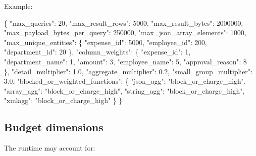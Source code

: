 \documentclass[
]{article}
\newenvironment{Shaded}{}{}
\newcommand{\DataTypeTok}[1]{\textcolor[rgb]{0.56,0.13,0.00}{#1}}
\newcommand{\DecValTok}[1]{\textcolor[rgb]{0.25,0.63,0.44}{#1}}
\newcommand{\FloatTok}[1]{\textcolor[rgb]{0.25,0.63,0.44}{#1}}
\newcommand{\FunctionTok}[1]{\textcolor[rgb]{0.02,0.16,0.49}{#1}}
\newcommand{\StringTok}[1]{\textcolor[rgb]{0.25,0.44,0.63}{#1}}
\begin{document}
Example:

\begin{Shaded}
\begin{Highlighting}[]
\FunctionTok{\{}
  \DataTypeTok{"max\_queries"}\FunctionTok{:} \DecValTok{20}\FunctionTok{,}
  \DataTypeTok{"max\_result\_rows"}\FunctionTok{:} \DecValTok{5000}\FunctionTok{,}
  \DataTypeTok{"max\_result\_bytes"}\FunctionTok{:} \DecValTok{2000000}\FunctionTok{,}
  \DataTypeTok{"max\_payload\_bytes\_per\_query"}\FunctionTok{:} \DecValTok{250000}\FunctionTok{,}
  \DataTypeTok{"max\_json\_array\_elements"}\FunctionTok{:} \DecValTok{1000}\FunctionTok{,}
  \DataTypeTok{"max\_unique\_entities"}\FunctionTok{:} \FunctionTok{\{}
    \DataTypeTok{"expense\_id"}\FunctionTok{:} \DecValTok{5000}\FunctionTok{,}
    \DataTypeTok{"employee\_id"}\FunctionTok{:} \DecValTok{200}\FunctionTok{,}
    \DataTypeTok{"department\_id"}\FunctionTok{:} \DecValTok{20}
  \FunctionTok{\},}
  \DataTypeTok{"column\_weights"}\FunctionTok{:} \FunctionTok{\{}
    \DataTypeTok{"expense\_id"}\FunctionTok{:} \DecValTok{1}\FunctionTok{,}
    \DataTypeTok{"department\_name"}\FunctionTok{:} \DecValTok{1}\FunctionTok{,}
    \DataTypeTok{"amount"}\FunctionTok{:} \DecValTok{3}\FunctionTok{,}
    \DataTypeTok{"employee\_name"}\FunctionTok{:} \DecValTok{5}\FunctionTok{,}
    \DataTypeTok{"approval\_reason"}\FunctionTok{:} \DecValTok{8}
  \FunctionTok{\},}
  \DataTypeTok{"detail\_multiplier"}\FunctionTok{:} \FloatTok{1.0}\FunctionTok{,}
  \DataTypeTok{"aggregate\_multiplier"}\FunctionTok{:} \FloatTok{0.2}\FunctionTok{,}
  \DataTypeTok{"small\_group\_multiplier"}\FunctionTok{:} \FloatTok{3.0}\FunctionTok{,}
  \DataTypeTok{"blocked\_or\_weighted\_functions"}\FunctionTok{:} \FunctionTok{\{}
    \DataTypeTok{"json\_agg"}\FunctionTok{:} \StringTok{"block\_or\_charge\_high"}\FunctionTok{,}
    \DataTypeTok{"array\_agg"}\FunctionTok{:} \StringTok{"block\_or\_charge\_high"}\FunctionTok{,}
    \DataTypeTok{"string\_agg"}\FunctionTok{:} \StringTok{"block\_or\_charge\_high"}\FunctionTok{,}
    \DataTypeTok{"xmlagg"}\FunctionTok{:} \StringTok{"block\_or\_charge\_high"}
  \FunctionTok{\}}
\FunctionTok{\}}
\end{Highlighting}
\end{Shaded}

\hypertarget{budget-dimensions}{%
\subsection{Budget dimensions}\label{budget-dimensions}}

The runtime may account for:
\end{document}
